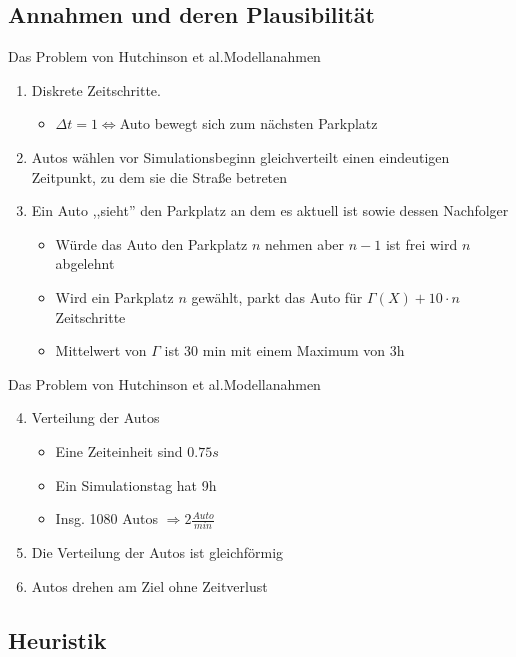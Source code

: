 \documentclass[11pt]{beamer}
\begin{document}
\subsection{Annahmen und deren Plausibilität}
\begin{frame}{Das Problem von Hutchinson et al.}{Modellanahmen}
\begin{enumerate}
	\item Diskrete Zeitschritte.
	\begin{itemize}
		\item $\Delta t = 1 \Leftrightarrow $Auto bewegt sich zum nächsten Parkplatz
	\end{itemize}
	\item Autos wählen vor Simulationsbeginn gleichverteilt einen eindeutigen Zeitpunkt, zu dem sie die Straße betreten
	\item Ein Auto ,,sieht'' den Parkplatz an dem es aktuell ist sowie dessen Nachfolger
	\pause
	\begin{itemize}
		\item Würde das Auto den Parkplatz $n$ nehmen aber $n-1$ ist frei wird $n$ abgelehnt
		\item Wird ein Parkplatz $n$ gewählt, parkt das Auto für $\Gamma (X)+10\cdot n$ Zeitschritte
		\item Mittelwert von $\Gamma$ ist 30 min mit einem Maximum von 3h
	\end{itemize}
\end{enumerate}
\end{frame}

\begin{frame}{Das Problem von Hutchinson et al.}{Modellanahmen}
	\begin{enumerate}
		\setcounter{enumi}{3}
		\item Verteilung der Autos
		\begin{itemize}
			\item Eine Zeiteinheit sind $0.75s$
			\item Ein Simulationstag hat 9h
			\item Insg. 1080 Autos $\Rightarrow 2 \frac{Auto}{min}$
		\end{itemize}
		\item Die Verteilung der Autos ist gleichförmig
		\item Autos drehen am Ziel ohne Zeitverlust
	\end{enumerate}
\end{frame}

\subsection{Heuristik}
\end{document}
